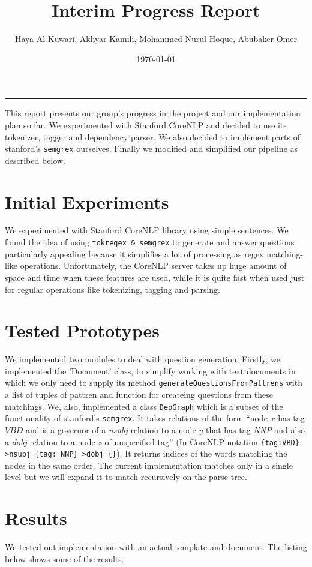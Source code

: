 \documentclass{article}
\title{Interim Progress Report}
\author{Haya Al-Kuwari, Akhyar Kamili, Mohammed Nurul Hoque, Abubaker Omer}
\date{\today}
\begin{document}
    \maketitle
    \noindent\rule{\textwidth}{1pt}
    This report presents our group's progress in the project and our implementation plan so far. We
    experimented with Stanford CoreNLP and decided to use its tokenizer, tagger and dependency
    parser. We also decided to implement parts of stanford's \texttt{semgrex} ourselves. Finally we
    modified and simplified our pipeline as described below.

    \section{Initial Experiments}
    We experimented with Stanford CoreNLP library using simple sentences. We found the idea of using
    \texttt{tokregex \& semgrex} to generate and answer questions particularly appealing because it
    simplifies a lot of processing as regex matching-like operations. Unfortunately, the CoreNLP
    server takes up huge amount of space and time when these features are used, while it is quite
    fast when used just for regular operations like tokenizing, tagging and parsing.

    \section{Tested Prototypes}
    We implemented two modules to deal with question generation. Firstly, we implemented the
    'Document' class, to simplify working with text documents in which we only need to supply its
    method \texttt{generateQuestionsFromPattrens} with a list of tuples of pattren and function for
    createing questions from these matchings. We, also, implemented a class \texttt{DepGraph} which
    is a subset of the functionality of stanford's \texttt{semgrex}. It takes relations of the form
    ``node $x$ has tag $VBD$ and is a governor of a \textit{nsubj} relation to a node $y$ that has
    tag \textit{NNP} and also a \textit{dobj} relation to a node $z$ of unspecified tag'' (In
    CoreNLP notation \texttt{\{tag:VBD\} >nsubj \{tag: NNP\} >dobj \{\}}). It returns indices of the
    words matching the nodes in the same order. The current implementation matches only in a single
    level but we will expand it to match recursively on the parse tree.

    \section{Results}
    We tested out implementation with an actual template and document. The listing below shows some of
    the results.
\end{document}
